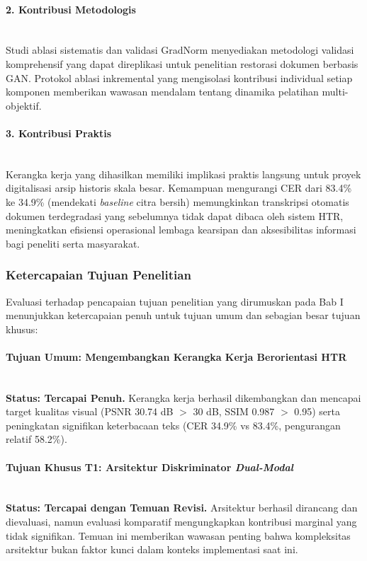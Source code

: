 \documentclass[12pt,a4paper]{article}
\begin{document}
\paragraph{2. Kontribusi Metodologis} \mbox{}\\[0.1em]
Studi ablasi sistematis dan validasi GradNorm menyediakan metodologi validasi komprehensif yang dapat direplikasi untuk penelitian restorasi dokumen berbasis GAN. Protokol ablasi inkremental yang mengisolasi kontribusi individual setiap komponen memberikan wawasan mendalam tentang dinamika pelatihan multi-objektif.

\paragraph{3. Kontribusi Praktis} \mbox{}\\[0.1em]
Kerangka kerja yang dihasilkan memiliki implikasi praktis langsung untuk proyek digitalisasi arsip historis skala besar. Kemampuan mengurangi CER dari 83.4\% ke 34.9\% (mendekati \textit{baseline} citra bersih) memungkinkan transkripsi otomatis dokumen terdegradasi yang sebelumnya tidak dapat dibaca oleh sistem HTR, meningkatkan efisiensi operasional lembaga kearsipan dan aksesibilitas informasi bagi peneliti serta masyarakat.

\vspace{0.8em}

\subsubsection{Ketercapaian Tujuan Penelitian}
\label{subsubsec:ketercapaian-tujuan}

Evaluasi terhadap pencapaian tujuan penelitian yang dirumuskan pada Bab I menunjukkan ketercapaian penuh untuk tujuan umum dan sebagian besar tujuan khusus:

\paragraph{Tujuan Umum: Mengembangkan Kerangka Kerja Berorientasi HTR} \mbox{}\\[0.1em]
\textbf{Status: Tercapai Penuh.} Kerangka kerja berhasil dikembangkan dan mencapai target kualitas visual (PSNR 30.74 dB $>$ 30 dB, SSIM 0.987 $>$ 0.95) serta peningkatan signifikan keterbacaan teks (CER 34.9\% vs 83.4\%, pengurangan relatif 58.2\%).

\paragraph{Tujuan Khusus T1: Arsitektur Diskriminator \textit{Dual-Modal}} \mbox{}\\[0.1em]
\textbf{Status: Tercapai dengan Temuan Revisi.} Arsitektur berhasil dirancang dan dievaluasi, namun evaluasi komparatif mengungkapkan kontribusi marginal yang tidak signifikan. Temuan ini memberikan wawasan penting bahwa kompleksitas arsitektur bukan faktor kunci dalam konteks implementasi saat ini.
\end{document}
